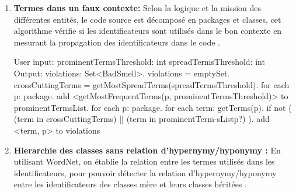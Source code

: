 \begin{enumerate}
\begin{framed}
{ 12.		end for.  end for\newline
 14.end for\newline
}
\end{framed}
\item \textbf {Termes dans un faux contexte:}
Selon la logique et la mission des différentes entités, le code source est décomposé en packages et classes, cet algorithme vérifie si les identificateurs sont utilisés dans le bon contexte en mesurant la propagation des identificateurs dans le code \cite{abebe2009lexicon}.
\newline
	
	\begin{framed}
  {\selectfont  
 User input:\newline
 prominentTermsThreshold: int\newline
 spreadTermsThreshold: int\newline
 Output:\newline
 violations: Set<BadSmell>. violations = emptySet. crossCuttingTerms = getMostSpreadTerms(spreadTermsThreshold). for each p: package.    add <getMostFrequentTerms(p, prominentTermsThreshold)> to prominentTermsList. for each p: package.    for each term: getTerms(p).      if not ( (term in crossCuttingTerms) || (term in prominentTerm-sListp?) ).         add <term, p> to violations\newline
}
\end{framed}
\newline
\item \textbf {Hierarchie des classes sans relation d’hypernymy/hyponymy :}
En utilisant WordNet, on établie la relation entre les termes utilisés dans les identificateurs, pour pouvoir détecter la relation d’hypernymy/hyponymy entre les identificateurs des classes mère et leurs classes héritées \cite{abebe2009lexicon}.
\newline
	

\end{enumerate}
